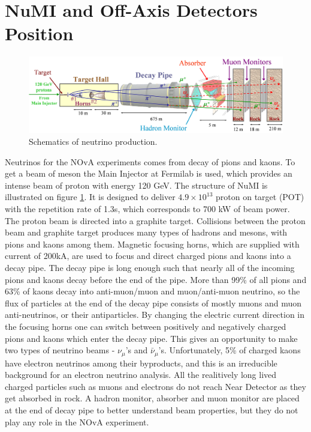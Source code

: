 \section{NuMI and Off-Axis Detectors Position}
\begin{figure}
\includegraphics[width=1.0\textwidth]{figures/Beamline.png}
\centering
\caption{Schematics of neutrino production\cite{numi}.} \label{fig:NuMI}
\end{figure}
Neutrinos for the NOvA experiments comes from decay of pions and kaons. To get a beam of 
meson the Main Injector at Fermilab is used, which provides an intense beam of proton with 
energy 120 GeV. The structure of NuMI is illustrated on figure \ref{fig:NuMI}. It is designed to 
deliver $4.9 \times 10^{13}$ proton on target (POT) with the repetition rate of 1.3s, which 
corresponds to 700 kW of beam power. The proton beam is directed into a graphite target.  
Collisions between the proton beam and graphite target produces many types of hadrons and 
mesons, with pions and kaons among them. Magnetic focusing horns, which are supplied with 
current of 200kA, are used to focus and direct 
charged pions and kaons into a decay pipe. The decay pipe is long enough such that nearly all 
of the incoming pions and kaons decay before the end of the pipe. More than 99\% of all pions 
and 63\% of kaons decay into anti-muon/muon and muon/anti-muon neutrino, so the flux of 
particles at the end of the decay pipe consists of mostly muons and muon anti-neutrinos, or 
their antiparticles. By changing the electric current direction in the focusing horns one can 
switch between positively and negatively charged pions and kaons which enter the decay pipe. 
This gives an opportunity to make two types of neutrino beams - $\nu_\mu$'s and $\bar{\nu}_\mu$'s. 
Unfortunately, 5\% of charged kaons have electron neutrinos among their byproducts, and this 
is an irreducible background for an electron neutrino analysis. All the realitively long lived
charged particles such as muons and electrons do not reach Near Detector as they get absorbed 
in rock. A hadron monitor, absorber and muon monitor are placed at the end of decay pipe 
to better understand beam properties, but they do not play any role in the NOvA experiment.

